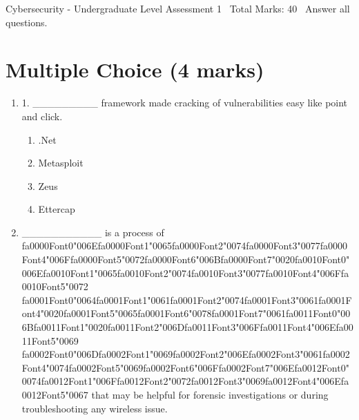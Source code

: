 \documentclass[12pt]{article}
\begin{document}
\begin{center}
Cybersecurity - Undergraduate Level Assessment 1 \
Total Marks: 40 \
Answer all questions.
\end{center}

\section*{Multiple Choice (4 marks)}
\begin{enumerate}[label=\arabic*.]
\item 1. \_\_\_\_\_\_\_\_\_ framework made cracking of vulnerabilities easy like point and click.
\begin{enumerate}[label=(\alph*)]
    \item .Net
    \item Metasploit
    \item Zeus
    \item Ettercap
\end{enumerate}
\item \_\_\_\_\_\_\_\_\_\_\_ is a process of {\csname fa0000Font0\endcsname\char"006E}{\csname fa0000Font1\endcsname\char"0065}{\csname fa0000Font2\endcsname\char"0074}{\csname fa0000Font3\endcsname\char"0077}{\csname fa0000Font4\endcsname\char"006F}{\csname fa0000Font5\endcsname\char"0072}{\csname fa0000Font6\endcsname\char"006B}{\csname fa0000Font7\endcsname\char"0020}{\csname fa0010Font0\endcsname\char"006E}{\csname fa0010Font1\endcsname\char"0065}{\csname fa0010Font2\endcsname\char"0074}{\csname fa0010Font3\endcsname\char"0077}{\csname fa0010Font4\endcsname\char"006F}{\csname fa0010Font5\endcsname\char"0072} {\csname fa0001Font0\endcsname\char"0064}{\csname fa0001Font1\endcsname\char"0061}{\csname fa0001Font2\endcsname\char"0074}{\csname fa0001Font3\endcsname\char"0061}{\csname fa0001Font4\endcsname\char"0020}{\csname fa0001Font5\endcsname\char"0065}{\csname fa0001Font6\endcsname\char"0078}{\csname fa0001Font7\endcsname\char"0061}{\csname fa0011Font0\endcsname\char"006B}{\csname fa0011Font1\endcsname\char"0020}{\csname fa0011Font2\endcsname\char"006D}{\csname fa0011Font3\endcsname\char"006F}{\csname fa0011Font4\endcsname\char"006E}{\csname fa0011Font5\endcsname\char"0069} {\csname fa0002Font0\endcsname\char"006D}{\csname fa0002Font1\endcsname\char"0069}{\csname fa0002Font2\endcsname\char"006E}{\csname fa0002Font3\endcsname\char"0061}{\csname fa0002Font4\endcsname\char"0074}{\csname fa0002Font5\endcsname\char"0069}{\csname fa0002Font6\endcsname\char"006F}{\csname fa0002Font7\endcsname\char"006E}{\csname fa0012Font0\endcsname\char"0074}{\csname fa0012Font1\endcsname\char"006F}{\csname fa0012Font2\endcsname\char"0072}{\csname fa0012Font3\endcsname\char"0069}{\csname fa0012Font4\endcsname\char"006E}{\csname fa0012Font5\endcsname\char"0067} that may be helpful for forensic investigations or during troubleshooting any wireless issue.

\end{enumerate}
\end{document}
